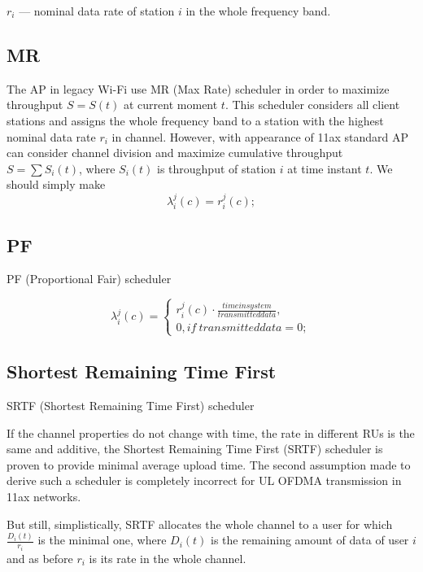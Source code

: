 $r_i$ --- nominal data rate of station $i$ in the whole frequency band. 

\subsection{MR}

The AP in legacy Wi-Fi use MR (Max Rate) scheduler in order to maximize  throughput $S = S(t)$ at current moment $t$. This scheduler considers all client stations and assigns the whole frequency band to a station with the highest nominal data rate $r_i$ in channel. 
However, with appearance of 11ax standard AP can consider channel division and maximize cumulative throughput $S = \sum S_i(t)$, where $S_i(t)$ is throughput of station $i$ at time instant $t$. We should simply make   
\begin{equation}
\lambda_i^j (c) = r_i^j (c);
\end{equation}

\subsection{PF}

PF (Proportional Fair) scheduler

\begin{equation}
\lambda_i^j (c) = \begin{cases}
r_i^j(c) \cdot \frac{timeinsystem}{transmitteddata},\\
0, if\ transmitteddata = 0;
\end{cases}
\end{equation}

\subsection{Shortest Remaining Time First}

SRTF (Shortest Remaining Time First) scheduler

If the channel properties do not change with time, the rate in different RUs is the same and additive, the Shortest Remaining Time First (SRTF) scheduler is proven to provide minimal average upload time. 
The second assumption made to derive such a scheduler is completely incorrect for UL OFDMA transmission in 11ax networks.

But still, simplistically, SRTF allocates the whole channel to a user for which $\frac{D_i(t)}{r_i}$ is the minimal one, where $D_i(t)$ is the remaining amount of data of user $i$ and as before $r_i$ is its rate in the whole channel.

